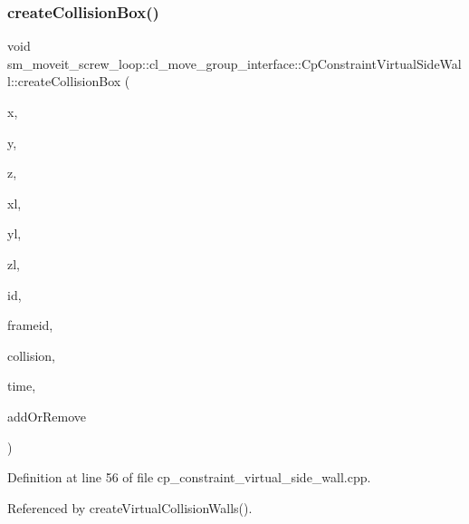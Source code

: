 \subsubsection{\texorpdfstring{create\+Collision\+Box()}{createCollisionBox()}}
{\footnotesize\ttfamily void sm\+\_\+moveit\+\_\+screw\+\_\+loop\+::cl\+\_\+move\+\_\+group\+\_\+interface\+::\+Cp\+Constraint\+Virtual\+Side\+Wall\+::create\+Collision\+Box (\begin{DoxyParamCaption}\item[{float}]{x,  }\item[{float}]{y,  }\item[{float}]{z,  }\item[{float}]{xl,  }\item[{float}]{yl,  }\item[{float}]{zl,  }\item[{std\+::string}]{id,  }\item[{std\+::string}]{frameid,  }\item[{moveit\+\_\+msgs\+::\+Collision\+Object \&}]{collision,  }\item[{const ros\+::\+Time \&}]{time,  }\item[{int}]{add\+Or\+Remove }\end{DoxyParamCaption})}



Definition at line 56 of file cp\+\_\+constraint\+\_\+virtual\+\_\+side\+\_\+wall.\+cpp.



Referenced by create\+Virtual\+Collision\+Walls().


